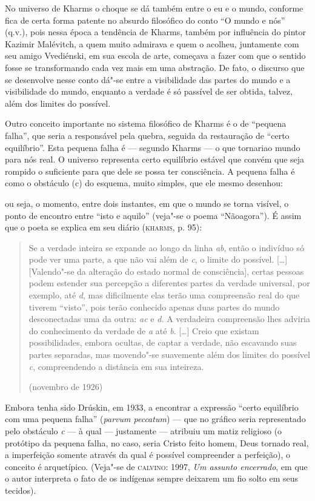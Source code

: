 No universo de Kharms o choque se dá também entre o eu e o mundo,
conforme fica de certa forma patente no absurdo filosófico do conto ``O
mundo e nós'' (q.v.), pois nessa época a tendência de Kharms, também por
influência do pintor Kazimir Malévitch, a quem muito admirava e quem o
acolheu, juntamente com seu amigo Vvediénski, em sua escola de arte,
começava a fazer com que o sentido fosse se transformando cada vez mais
em uma abstração. De fato, o discurso que se desenvolve nesse conto
dá"-se entre a visibilidade das partes do mundo e a visibilidade do
mundo, enquanto a verdade é só passível de ser obtida, talvez, além dos
limites do possível.

Outro conceito importante no sistema filosófico de Kharms é o de
``pequena falha'', que seria a responsável pela quebra, seguida da
restauração de ``certo equilíbrio''. Esta pequena falha é --- segundo
Kharms --- o que tornariao mundo para nós real. O universo representa
certo equilíbrio estável que convém que seja rompido o suficiente para
que dele se possa ter consciência. A pequena falha é como o obstáculo
(c) do esquema, muito simples, que ele mesmo desenhou:

ou seja, o momento, entre dois instantes, em que o mundo se torna
visível, o ponto de encontro entre ``isto e aquilo'' (veja"-se o poema
``Nãoagora''). É assim que o poeta se explica em seu diário
(\textsc{kharms}, p. 95):

\begin{quote}
Se a verdade inteira se expande ao longo da linha \emph{ab}, então o
indivíduo só pode ver uma parte, a que não vai além de \emph{c}, o
limite do possível. {[}\ldots{}{]} {[}Valendo"-se da alteração do estado
normal de consciência{]}, certas pessoas podem estender sua percepção a
diferentes partes da verdade universal, por exemplo, até \emph{d}, mas
dificilmente elas terão uma compreensão real do que tiverem ``visto'',
pois terão conhecido apenas duas partes do mundo desconectadas uma da
outra: \emph{ac} e \emph{d.} A verdadeira compreensão lhes adviria do
conhecimento da verdade de \emph{a} até \emph{b}. {[}\ldots{}{]} Creio que
existam possibilidades, embora ocultas, de captar a verdade, não
escavando suas partes separadas, mas movendo"-se suavemente além dos
limites do possível \emph{c}, compreendendo a distância em sua
inteireza.

(novembro de 1926)
\end{quote}

Embora tenha sido Drúskin, em 1933, a encontrar a expressão ``certo
equilíbrio com uma pequena falha'' (\emph{parvum peccatum}) --- que no
gráfico seria representado pelo obstáculo \emph{c} --- à qual ---
justamente --- atribuiu um matiz religioso (o protótipo da pequena falha,
no caso, seria Cristo feito homem, Deus tornado real, a imperfeição
somente através da qual é possível compreender a perfeição), o conceito
é arquetípico. (Veja"-se de \textsc{calvino}: 1997, \emph{Um assunto
encerrado}, em que o autor interpreta o fato de os indígenas sempre
deixarem um fio solto em seus tecidos).

